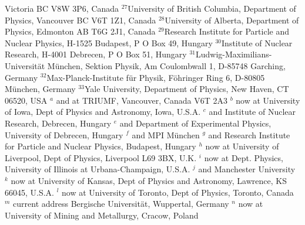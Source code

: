 \documentclass[12pt,a4paper,twoside]{article}
\begin{document}
Victoria BC V8W 3P6, Canada
\newline
$^{ 27}$University of British Columbia, Department of Physics,
Vancouver BC V6T 1Z1, Canada
\newline
$^{ 28}$University of Alberta,  Department of Physics,
Edmonton AB T6G 2J1, Canada
\newline
$^{ 29}$Research Institute for Particle and Nuclear Physics,
H-1525 Budapest, P O  Box 49, Hungary
\newline
$^{ 30}$Institute of Nuclear Research,
H-4001 Debrecen, P O  Box 51, Hungary
\newline
$^{ 31}$Ludwig-Maximilians-Universit\"at M\"unchen,
Sektion Physik, Am Coulombwall 1, D-85748 Garching, Germany
\newline
$^{ 32}$Max-Planck-Institute f\"ur Physik, F\"ohringer Ring 6,
D-80805 M\"unchen, Germany
\newline
$^{ 33}$Yale University, Department of Physics, New Haven,
CT 06520, USA
\newline
\bigskip\newline
$^{  a}$ and at TRIUMF, Vancouver, Canada V6T 2A3
\newline
$^{  b}$ now at University of Iowa, Dept of Physics and Astronomy, Iowa, U.S.A.
\newline
$^{  c}$ and Institute of Nuclear Research, Debrecen, Hungary
\newline
$^{  e}$ and Department of Experimental Physics, University of Debrecen,
Hungary
\newline
$^{  f}$ and MPI M\"unchen
\newline
$^{  g}$ and Research Institute for Particle and Nuclear Physics,
Budapest, Hungary
\newline
$^{  h}$ now at University of Liverpool, Dept of Physics,
Liverpool L69 3BX, U.K.
\newline
$^{  i}$ now at Dept. Physics, University of Illinois at Urbana-Champaign,
U.S.A.
\newline
$^{  j}$ and Manchester University
\newline
$^{  k}$ now at University of Kansas, Dept of Physics and Astronomy,
Lawrence, KS 66045, U.S.A.
\newline
$^{  l}$ now at University of Toronto, Dept of Physics, Toronto, Canada
\newline
$^{  m}$ current address Bergische Universit\"at, Wuppertal, Germany
\newline
$^{  n}$ now at University of Mining and Metallurgy, Cracow, Poland
\end{document}
